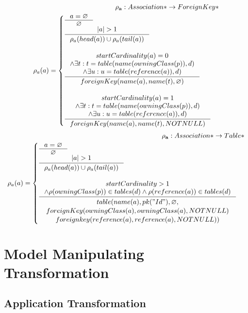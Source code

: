 \documentclass[11pt]{article}
\begin{document}
\begin{align*}
	\mathbf{\rho_a} : Association* \rightarrow ForeignKey* \\
	\rho_a(a) = \begin{cases}
		\inference{a = \varnothing}{\varnothing}\\
		\inference{|a| > 1}{\rho_{a}(head(a)) \cup \rho_{a}(tail(a))}\\\\
		\inference{ startCardinality(a) = 0 \\ \wedge \exists t : t = table(name(owningClass(p)), d) \\ \wedge \exists u : u = table(reference(a)), d)
		}{
			foreignKey(name(a), name(t),  \varnothing) 
	 	}
  \\ \\
 	 \inference{ startCardinality(a) = 1 \\ \wedge \exists t : t = table(name(owningClass(p)), d) \\ \wedge \exists u : u = table(reference(a)), d)
 	 }{ 
		foreignKey(name(a), name(t),  NOTNULL)
	}
	 \end{cases}
\end{align*}
\begin{align*} 
	\mathbf{\rho_a} : Association* \rightarrow Table* \\
	\rho_a(a) = \begin{cases}
 		\inference{a = \varnothing}{\varnothing}\\
		\inference{|a| > 1}{\rho_{a}(head(a)) \cup \rho_{a}(tail(a))}\\\\
		\inference{  startCardinality > 1 \\ \wedge \rho(owningClass(p)) \in tables(d) \wedge \rho(reference(a)) \in tables(d)
  		}{\begin{gathered}  
		 table(name(a), pk("Id"), \varnothing, \\ foreignKey(owningClass(a),owningClass(a), NOTNULL) \\ foreignkey(reference(a), reference(a), NOTNULL)) 
  		\end{gathered}}  
 	\end{cases}
\end{align*}

\section{Model Manipulating Transformation}
\subsection{Application Transformation}
\end{document}
